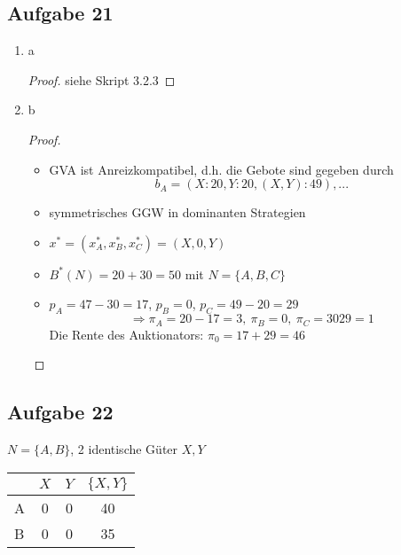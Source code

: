 \documentclass[12pt]{extreport} %
\theoremstyle{named}
\theoremstyle{nnamed}
\theoremstyle{itshape}
\theoremstyle{normal}
\begin{document}
\subsection*{Aufgabe 21}
\begin{enumerate}
	\item a
		\begin{proof}
			siehe Skript 3.2.3
		\end{proof}
	\item b
		\begin{proof} ~\
			\begin{itemize}
				\item GVA ist Anreizkompatibel, d.h. die Gebote sind gegeben durch
					$$b_A = (X: 20, Y: 20, (X,Y) : 49), ...  $$
				\item symmetrisches GGW in dominanten Strategien
				\item $x^* = (x_A^*, x_B^*, x_C^*) = (X, 0, Y)$
				\item $B^*(N) = 20 + 30 = 50$ mit $N = \{ A, B, C \}$
				\item $p_A = 47 - 30 = 17$, $p_B = 0$, $p_C = 49 - 20 = 29$
					$$ \Rightarrow \pi_A = 20- 17 = 3, ~\pi_B = 0, ~\pi_C = 30  29 = 1 $$
					Die Rente des Auktionators: $\pi_0 = 17 +29 = 46$
			\end{itemize}
		\end{proof}
\end{enumerate}


\subsection*{Aufgabe 22}
$N = \{ A, B \}$, 2 identische Güter $X, Y$
\begin{figure*}[hbt]	\centering
\begin{tabular}{l|ccc}
  & $X$ & $Y$ & $\{X, Y \}$ \\
  \hline
  A & 0 & 0 & 40 \\
  B & 0 & 0 & 35
\end{tabular}
\end{figure*} 
\end{document}
